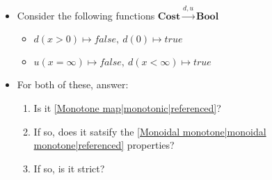 
\begin{itemize}
    \item Consider the following functions $\mathbf{Cost} \xrightarrow{d,u} \mathbf{Bool}$
          \begin{itemize}
            \item $d(x>0)\mapsto false,\ d(0)\mapsto true$
            \item $u(x=\infty)\mapsto false,\ d(x < \infty) \mapsto true$
          \end{itemize}
    \item For both of these, answer:
          \begin{enumerate}
            \item Is it \ref{Monotone map|monotonic|referenced}?
            \item If so, does it satsify the \ref{Monoidal monotone|monoidal monotone|referenced} properties?
            \item If so, is it strict?
          \end{enumerate}
  \end{itemize}